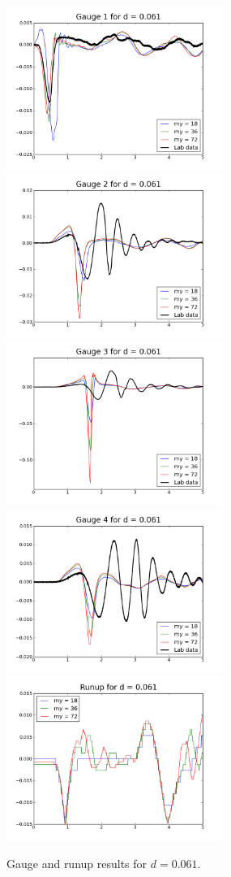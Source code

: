 \begin{figure}[ht]
\hfil\includegraphics[width=2.8in]{bp3/gauge1-d0-061.png}\hfil
\hfil\includegraphics[width=2.8in]{bp3/gauge2-d0-061.png}\hfil
\vskip 10pt
\hfil\includegraphics[width=2.8in]{bp3/gauge3-d0-061.png}\hfil
\hfil\includegraphics[width=2.8in]{bp3/gauge4-d0-061.png}\hfil
\vskip 10pt
\hfil\includegraphics[width=2.8in]{bp3/runup-d0-061.png}\hfil

\caption{\label{fig:bp3gauge1} 
Gauge and runup results for $d=0.061$.
  }
\end{figure}


